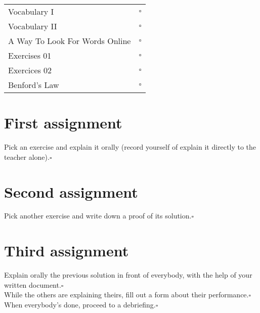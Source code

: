 \documentclass[12pt,a4paper,english,firamath,eval]{nsi}
\begin{document}
\maketitle
\tabstyle[UGLiRed]
\begin{center}
    \begin{tabular}{l|r}
        Vocabulary I & $\square$ \\
        Vocabulary II & $\square$ \\
        A Way To Look For Words Online & $\square$ \\
        Exercises 01 & $\square$ \\
        Exercices 02 & $\square$ \\
        Benford's Law & $\square$ \\
    \end{tabular}
\end{center}
\section*{First assignment}
Pick an exercise and explain it orally (record yourself of explain it directly to the teacher alone).\hfill$\square$\\

\section*{Second assignment}
Pick another exercise and write down a proof of its solution.\hfill$\square$\\

\section*{Third assignment}
Explain orally the previous solution in front of everybody, with the help of your written document.\hfill$\square$\\
While the others are explaining theirs, fill out a form about their performance.\hfill$\square$\\
When everybody's done, proceed to a debriefing.\hfill$\square$\\
\end{document}
